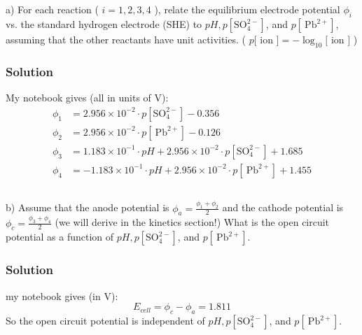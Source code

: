 \documentclass[12pt]{article}
\begin{document}
\subsection{}
a) For each reaction ( $i=1,2,3,4$ ), relate the equilibrium electrode potential $\phi_{i}$ vs. the standard hydrogen electrode (SHE) to $p H, p\left[\mathrm{SO}_{4}^{2-}\right]$, and $p\left[\mathrm{~Pb}^{2+}\right]$, assuming that the other reactants have unit activities. ( $p[$ ion $]=-\log _{10}[$ ion $]$ )\\
\subsubsection{Solution}
My notebook gives (all in units of V):
\begin{align}
    \phi_1 &= 2.956 \times 10^{-2} \cdot p\left[\mathrm{SO}_{4}^{2-}\right] - 0.356 \\
    \phi_2 &= 2.956 \times 10^{-2} \cdot p\left[\mathrm{~Pb}^{2+}\right] - 0.126 \\
    \phi_3 &= 1.183 \times 10^{-1} \cdot pH + 2.956 \times 10^{-2} \cdot p\left[\mathrm{SO}_{4}^{2-}\right] + 1.685 \\
    \phi_4 &= -1.183 \times 10^{-1} \cdot pH + 2.956 \times 10^{-2} \cdot p\left[\mathrm{~Pb}^{2+}\right] + 1.455
\end{align}
\subsection{}
b) Assume that the anode potential is $\phi_{a}=\frac{\phi_{1}+\phi_{2}}{2}$ and the cathode potential is $\phi_{c}=\frac{\phi_{3}+\phi_{4}}{2}$ (we will derive in the kinetics section!) What is the open circuit potential as a function of $p H, p\left[\mathrm{SO}_{4}^{2-}\right]$, and $p\left[\mathrm{~Pb}^{2+}\right]$.\\
\subsubsection{Solution}
my notebook gives (in V):
\begin{equation}
    E_{cell} = \phi_c - \phi_a = 1.811
\end{equation}
So the open circuit potential is independent of $pH, p\left[\mathrm{SO}_{4}^{2-}\right]$, and $p\left[\mathrm{~Pb}^{2+}\right]$.
\end{document}
